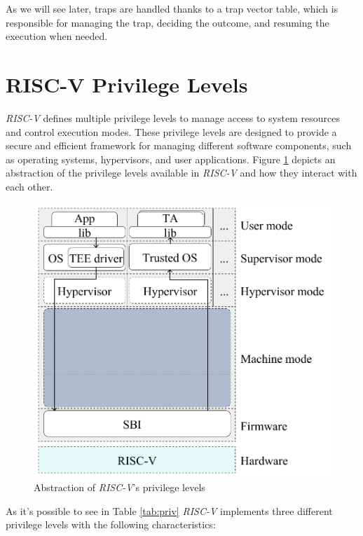 As we will see later, traps are handled thanks to a trap vector table, which is
responsible for managing the trap, deciding the outcome, and resuming the
execution when needed.

\section{RISC-V Privilege Levels}
\label{sec:riscv_privileges}

\textit{RISC-V} defines multiple privilege levels to manage access to system
resources and control execution modes. These privilege levels are designed to provide
a secure and efficient framework for managing different software components,
such as operating systems, hypervisors, and user applications. Figure \ref{fig:priv}
depicts an abstraction of the privilege levels available in \textit{RISC-V} and
how they interact with each other.

\begin{figure}[htbp]
  \centering
  \includegraphics[width=.5\linewidth]{images/privileges.png}
  \caption{Abstraction of \textit{RISC-V}'s privilege levels}
  \label{fig:priv}
\end{figure}

As it's possible to see in Table \ref{tab:priv} \textit{RISC-V} implements three
different privilege levels with the following characteristics:

